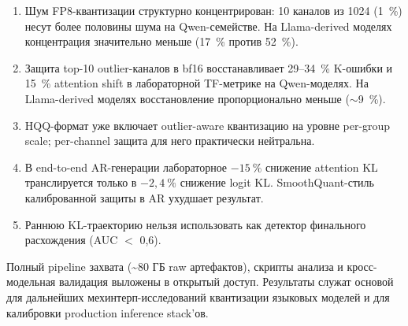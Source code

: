 \documentclass[a4paper,12pt]{article}
\begin{document}
\begin{enumerate}[label=\arabic*.,leftmargin=*]
\item Шум FP8-квантизации структурно концентрирован: 10 каналов из 1024 (1~\%) несут более половины шума на Qwen-семействе. На Llama-derived моделях концентрация значительно меньше (17~\% против 52~\%).
\item Защита top-10 outlier-каналов в bf16 восстанавливает 29--34~\% K-ошибки и 15~\% attention shift в лабораторной TF-метрике на Qwen-моделях. На Llama-derived моделях восстановление пропорционально меньше ($\sim$9~\%).
\item HQQ-формат уже включает outlier-aware квантизацию на уровне per-group scale; per-channel защита для него практически нейтральна.
\item В end-to-end AR-генерации лабораторное $-15~\%$ снижение attention KL транслируется только в $-2{,}4~\%$ снижение logit KL. SmoothQuant-стиль калиброванной защиты в AR ухудшает результат.
\item Раннюю KL-траекторию нельзя использовать как детектор финального расхождения (AUC $<$ 0{,}6).
\end{enumerate}

Полный pipeline захвата (\textasciitilde 80 ГБ raw артефактов), скрипты анализа и кросс-модельная валидация выложены в открытый доступ. Результаты служат основой для дальнейших мехинтерп-исследований квантизации языковых моделей и для калибровки production inference stack'ов.
\end{document}
